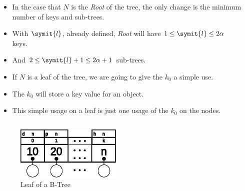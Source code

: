 \begin{frame}
    \begin{columns}
        \begin{column}{\textlecolumn}
            \begin{block}{}
                \begin{itemize}
                    \item In the case that \(N\) is the \emph{Root} of the tree, the only change is the minimum number of keys and sub-trees.
                    \item With \(\symit{l}\), already defined, \emph{Root} will have \(1 \leq \symit{l} \leq 2\alpha\) keys.
                    \item And \(2 \leq \symit{l} + 1 \leq 2\alpha + 1\) sub-trees.
                \end{itemize}
                \begin{itemize}
                    \item If \(N\) is a leaf of the tree, we are going to give the \(k_0\) a simple use.
                    \item The \(k_0\) will store a key value for an object.
                    \item This simple usage on a leaf is just one usage of the \(k_0\) on the nodes.
                \end{itemize}
            \end{block}
        \end{column}
        \begin{column}{\textricolumn}
            \begin{block}{}
            \end{block}
        \end{column}
    \end{columns}
    \begin{figure}
        \includegraphics[width=0.45\textwidth]{resources/made/single_leaf.eps}
        \caption[]{Leaf of a B-Tree}
    \end{figure}

    \framebreak


\end{frame}
